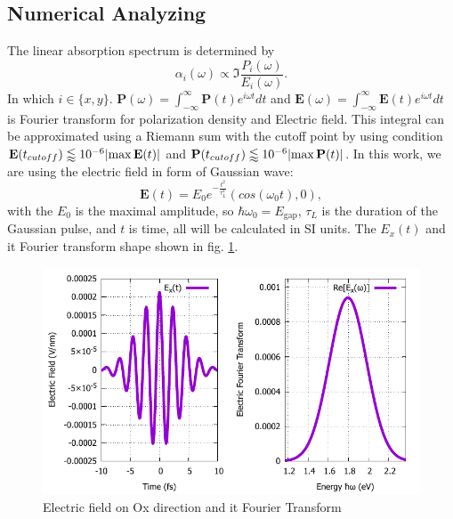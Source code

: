 \documentclass[12pt,english,a4paper]{article}
\begin{document}
\subsection{Numerical Analyzing}
\quad The linear absorption spectrum is determined by
\begin{equation}
	\alpha_{i}(\omega) \propto \Im{\frac{P_i(\omega)}{E_i(\omega)}}.
	\label{absorpt}
\end{equation}
\quad In which $i \in \{x,y\}$. $\textbf{P}(\omega)= \int_{-\infty}^{\infty}\textbf{P}(t) e^{i\omega t} dt$ and $\textbf{E}(\omega) = \int_{-\infty}^{\infty}\textbf{E}(t) e^{i\omega t} dt$ is Fourier transform for polarization density and Electric field. This integral can be approximated using a Riemann sum with the cutoff point by using condition $\textbf{E}(t_{cutoff}) \lessapprox 10^{-6} \abs{\max{\textbf{E}(t)}}$ and $\textbf{P}(t_{cutoff}) \lessapprox 10^{-6} \abs{\max{\textbf{P}(t)}}$. In this work, we are using the electric field in form of Gaussian wave:
\begin{equation}
	\textbf{E}(t) = E_0 e^{-\frac{t^2}{\tau_L^2}}(cos(\omega_0t), 0),
\end{equation} 
with the $E_0$ is the maximal amplitude, so $\hbar\omega_0 = E_{\mathrm{gap}}$, $\tau_L$ is the duration of the Gaussian pulse, and $t$ is time, all will be calculated in SI units. The $E_x(t)$ and it Fourier transform shape shown in fig. \ref{Et}.\\
\begin{figure}
	\begin{center}
\includegraphics[width = 0.75\linewidth]{Images/EAt.pdf}
\caption{Electric field on Ox direction and it Fourier Transform}
\label{Et}
	\end{center}
\end{figure}
\end{document}
